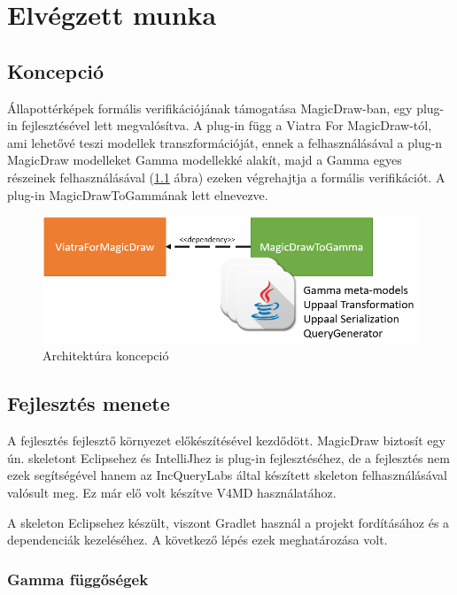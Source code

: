 \chapter{Elvégzett munka}


\section{Koncepció}
Állapottérképek formális verifikációjának támogatása MagicDraw-ban, egy plug-in fejlesztésével lett megvalósítva. A plug-in függ a Viatra For MagicDraw-tól, ami lehetővé teszi modellek transzformációját, ennek a felhasználásával a plug-n MagicDraw modelleket Gamma modellekké alakít, majd a Gamma egyes részeinek felhasználásával (\ref{fig:used-gamma} ábra) ezeken végrehajtja a formális verifikációt. A plug-in MagicDrawToGammának lett elnevezve.

\begin{figure}[!ht]
	\centering
	\includegraphics[keepaspectratio, width=120mm]{figures/plan.png}
	\caption{Architektúra koncepció}
	\label{fig:used-gamma}
\end{figure}

\section{Fejlesztés menete}
 A fejlesztés fejlesztő környezet előkészítésével kezdődött. MagicDraw biztosít egy ún. skeletont Eclipsehez és IntelliJhez is plug-in fejlesztéséhez, de a fejlesztés nem ezek segítségével hanem az IncQueryLabs által készített skeleton felhasználásával valósult meg. Ez már elő volt készítve V4MD használatához.
 
A skeleton Eclipsehez készült, viszont Gradlet használ a projekt fordításához és a dependenciák kezeléséhez. A következő lépés ezek meghatározása volt.

\subsection{Gamma függőségek}
